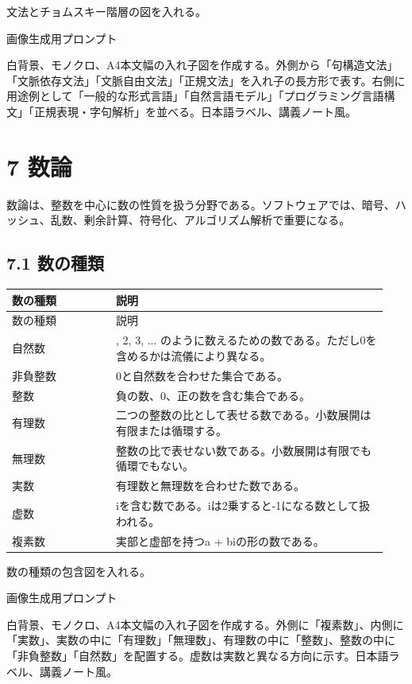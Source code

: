 \documentclass[uplatex,dvipdfmx,a4paper,10pt]{jsarticle}
\begin{document}
\begin{todobox}
文法とチョムスキー階層の図を入れる。

画像生成用プロンプト

白背景、モノクロ、A4本文幅の入れ子図を作成する。外側から「句構造文法」「文脈依存文法」「文脈自由文法」「正規文法」を入れ子の長方形で表す。右側に用途例として「一般的な形式言語」「自然言語モデル」「プログラミング言語構文」「正規表現・字句解析」を並べる。日本語ラベル、講義ノート風。
\end{todobox}
\section{7 数論}
数論は、整数を中心に数の性質を扱う分野である。ソフトウェアでは、暗号、ハッシュ、乱数、剰余計算、符号化、アルゴリズム解析で重要になる。

\subsection{7.1 数の種類}
\begin{longtable}{>{\raggedright\arraybackslash}p{0.26\linewidth} >{\raggedright\arraybackslash}p{0.68\linewidth}}
\toprule
数の種類 & 説明 \\
\midrule
\endfirsthead
\toprule
数の種類 & 説明 \\
\midrule
\endhead
自然数 & 1, 2, 3, ... のように数えるための数である。ただし0を含めるかは流儀により異なる。 \\
非負整数 & 0と自然数を合わせた集合である。 \\
整数 & 負の数、0、正の数を含む集合である。 \\
有理数 & 二つの整数の比として表せる数である。小数展開は有限または循環する。 \\
無理数 & 整数の比で表せない数である。小数展開は有限でも循環でもない。 \\
実数 & 有理数と無理数を合わせた数である。 \\
虚数 & iを含む数である。iは2乗すると-1になる数として扱われる。 \\
複素数 & 実部と虚部を持つa + biの形の数である。 \\
\bottomrule
\end{longtable}
\begin{todobox}
数の種類の包含図を入れる。

画像生成用プロンプト

白背景、モノクロ、A4本文幅の入れ子図を作成する。外側に「複素数」、内側に「実数」、実数の中に「有理数」「無理数」、有理数の中に「整数」、整数の中に「非負整数」「自然数」を配置する。虚数は実数と異なる方向に示す。日本語ラベル、講義ノート風。
\end{todobox}
\end{document}
